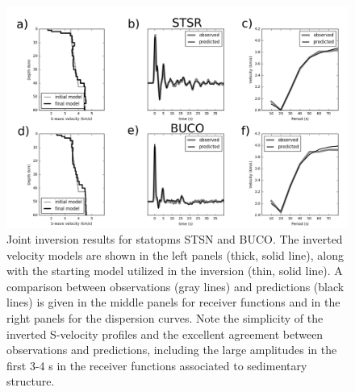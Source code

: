 \documentclass[manuscript,11pt]{geophysics}
\begin{document}
\begin{figure}[!ht]
\begin{center}
\includegraphics[width=\textwidth]{Fig/joint_inversion_results.png}
\caption{Joint inversion results for statopms STSN and BUCO. The inverted velocity models are shown in the left panels (thick, solid line), along with the starting model utilized in the inversion (thin, solid line). A comparison between observations (gray lines) and predictions (black lines) is given in the middle panels for receiver functions and in the right panels for the dispersion curves. Note the simplicity of the inverted S-velocity profiles and the excellent agreement between observations and predictions, including the large amplitudes in the first 3-4 s in the receiver functions associated to sedimentary structure.}
\label{joint_inversion}
\end{center}
\end{figure}
\end{document}
